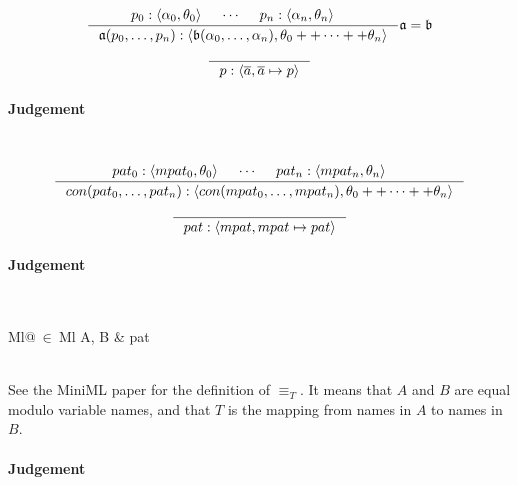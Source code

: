 \[
\inference
{
  p_0 : \langle \alpha_0, \theta_0 \rangle &
  \cdots &
  p_n : \langle \alpha_n, \theta_n \rangle &
}
{
  \mathfrak{a} (p_0, \ldots, p_n) :
  \langle \mathfrak{b} (\alpha_0, \ldots, \alpha_n), \theta_0 ++ \cdots ++
  \theta_n \rangle
}
{
  \mathfrak{a} = \mathfrak{b}
}
\]

\[
\inference
{
}
{
  p : \langle \overline{a}, \overline{a} \mapsto p \rangle
}
\]


\paragraph{Judgement} \\

\[
\inference
{
  pat_0 : \langle mpat_0, \theta_0 \rangle &
  \cdots &
  pat_n : \langle mpat_n, \theta_n \rangle &
}
{
  con (pat_0, \ldots, pat_n) :
  \langle con (mpat_0, \ldots, mpat_n), \theta_0 ++ \cdots ++
  \theta_n \rangle
}
\]

\[
\inference
{
}
{
  pat : \langle mpat, mpat \mapsto pat \rangle
}
\]

\clearpage

\paragraph{Judgement} \\
\indent\begin{tabular}{Ml@{$\ \in\ $}Ml}
  A, B & pat
\end{tabular}\\

See the MiniML paper for the definition of $\equiv_T$. It means that $A$ and $B$
are equal modulo variable names, and that $T$ is the mapping from names in $A$
to names in $B$.


\paragraph{Judgement} \\

